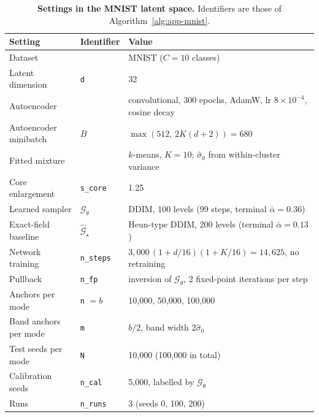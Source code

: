 \begin{table}[htbp]
\centering
\small
\caption{\textbf{Settings in the MNIST latent space.} Identifiers are those of
Algorithm~\ref{alg:app-mnist}.}
\label{tab:app-mnist}
\begin{tabular}{lll}
\toprule
Setting & Identifier & Value \\
\midrule
Dataset                    &                         & MNIST ($C = 10$ classes) \\
Latent dimension           & \texttt{d}              & 32 \\
Autoencoder                &                         & convolutional, 300 epochs, AdamW, lr $8\times10^{-4}$, cosine decay \\
Autoencoder minibatch      & $B$                     & $\max(512,\, 2K(d + 2)) = 680$ \\
Fitted mixture             &                         & $k$-means, $K = 10$; $\hat\sigma_0$ from within-cluster variance \\
Core enlargement           & \texttt{s\_core}        & 1.25 \\
Learned sampler            & $\mathcal{G}_\theta$    & DDIM, 100 levels (99 steps, terminal $\bar\alpha = 0.36$) \\
Exact-field baseline       & $\hat{\mathcal{G}}_\star$ & Heun-type DDIM, 200 levels (terminal $\bar\alpha = 0.13$) \\
Network training           & \texttt{n\_steps}       & $3{,}000\,(1 + d/16)(1 + K/16) = 14{,}625$, no retraining \\
Pullback                   & \texttt{n\_fp}          & inversion of $\mathcal{G}_\theta$, 2 fixed-point iterations per step \\
Anchors per mode           & \texttt{n} $= b$        & 10{,}000, 50{,}000, 100{,}000 \\
Band anchors per mode      & \texttt{m}              & $b/2$, band width $2\hat\sigma_0$ \\
Test seeds per mode        & \texttt{N}              & 10{,}000 (100{,}000 in total) \\
Calibration seeds          & \texttt{n\_cal}         & 5{,}000, labelled by $\mathcal{G}_\theta$ \\
Runs                       & \texttt{n\_runs}        & 3 (seeds 0, 100, 200) \\
\bottomrule
\end{tabular}
\end{table}
